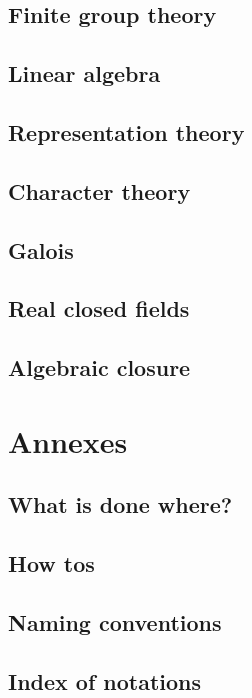 \documentclass{book}
\begin{document}
\chapter{Finite group theory}

\chapter{Linear algebra}

\chapter{Representation theory}

\chapter{Character theory}

\chapter{Galois}

\chapter{Real closed fields}

\chapter{Algebraic closure}

\part{Annexes}

\chapter{What is done where?}

\chapter{How tos}

\chapter{Naming conventions}

\chapter{Index of notations}
\end{document}
